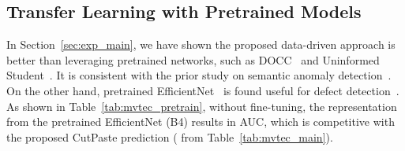 \documentclass[final]{cvpr}
\begin{document}
\subsection{Transfer Learning with Pretrained Models}
\label{sec:exp_fine-tune}
In Section~\ref{sec:exp_main}, we have shown the proposed data-driven approach is better than leveraging pretrained networks, such as DOCC~\cite{ruff2020unifying} and Uninformed Student~\cite{bergmann2020uninformed}. It is consistent with the prior study on semantic anomaly detection~\cite{sohn2020learning}.
On the other hand, pretrained EfficientNet~\cite{tan2019efficientnet} is found useful for defect detection~\cite{rippel2020modeling}. 
As shown in Table~\ref{tab:mvtec_pretrain}, without fine-tuning, the representation from the pretrained EfficientNet (B4) results in  AUC, which is competitive with the proposed CutPaste prediction ( from Table~\ref{tab:mvtec_main}).
\end{document}
